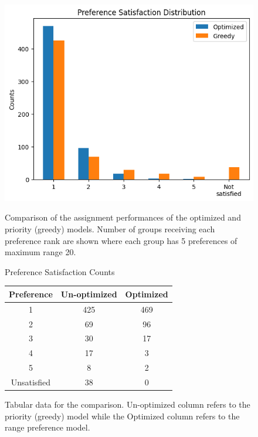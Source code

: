 \documentclass[12pt]{article}
\begin{document}
    \begin{figure}[h]
        \centering
        \begin{multicols}{2}
            \includegraphics[width=\linewidth]{res/preference_satisfaction_comparison.png}

\caption{Comparison of the assignment performances of the optimized and priority (greedy) models. Number of groups receiving each preference rank are shown where each group has 5 preferences of maximum range 20.}
        \label{fig:preference_satisfaction}
             
      \columnbreak      

      Preference Satisfaction Counts
            \begin{tabular}{c|cc}
                Preference & Un-optimized & Optimized \\
                \hline
                1 & 425 & 469\\
                2 & 69 & 96\\
                3 & 30 & 17\\
                4 & 17 & 3\\
                5 & 8 & 2\\
                \hline
                Unsatisfied & 38 & 0
            \end{tabular}
        \caption{Tabular data for the comparison. Un-optimized column refers to the priority (greedy) model while the Optimized column refers to the range preference model.}
        \label{fig:tabulardata}
        \end{multicols}
    \end{figure}
\end{document}
